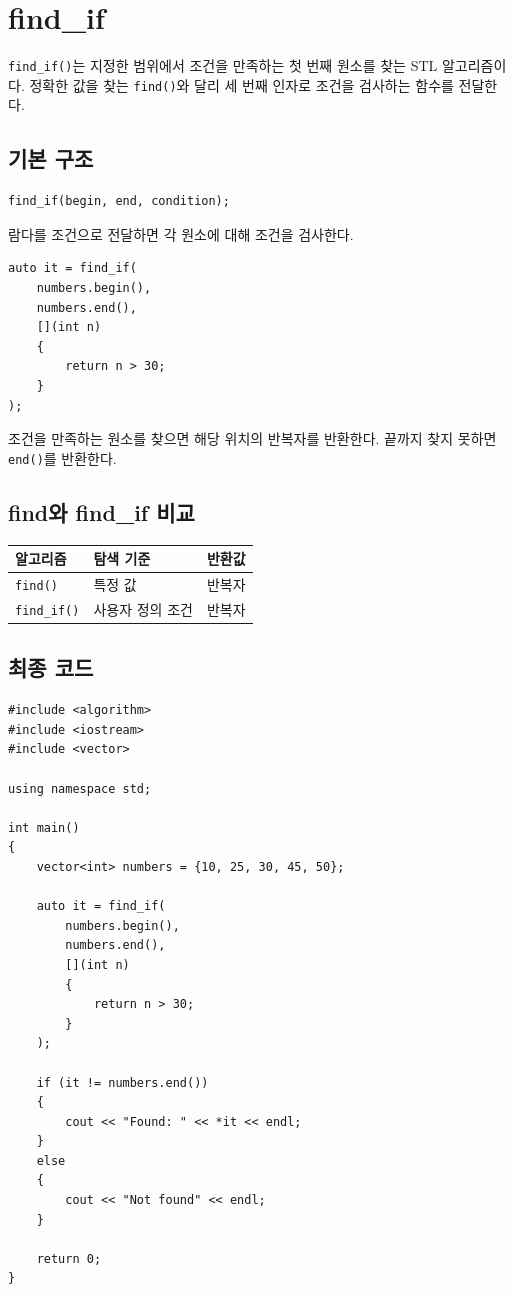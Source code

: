 \documentclass[11pt,a4paper]{article}
\begin{document}
\section{find\_if}
\texttt{find\_if()}는 지정한 범위에서 조건을 만족하는 첫 번째 원소를 찾는 STL 알고리즘이다.
정확한 값을 찾는 \texttt{find()}와 달리 세 번째 인자로 조건을 검사하는 함수를 전달한다.

\subsection{기본 구조}
\begin{lstlisting}
find_if(begin, end, condition);
\end{lstlisting}

람다를 조건으로 전달하면 각 원소에 대해 조건을 검사한다.

\begin{lstlisting}
auto it = find_if(
    numbers.begin(),
    numbers.end(),
    [](int n)
    {
        return n > 30;
    }
);
\end{lstlisting}

조건을 만족하는 원소를 찾으면 해당 위치의 반복자를 반환한다.
끝까지 찾지 못하면 \texttt{end()}를 반환한다.

\subsection{find와 find\_if 비교}
\begin{center}
\begin{tabular}{lll}
\toprule
알고리즘 & 탐색 기준 & 반환값 \\
\midrule
\texttt{find()} & 특정 값 & 반복자 \\
\texttt{find\_if()} & 사용자 정의 조건 & 반복자 \\
\bottomrule
\end{tabular}
\end{center}

\subsection{최종 코드}
\begin{lstlisting}
#include <algorithm>
#include <iostream>
#include <vector>

using namespace std;

int main()
{
    vector<int> numbers = {10, 25, 30, 45, 50};

    auto it = find_if(
        numbers.begin(),
        numbers.end(),
        [](int n)
        {
            return n > 30;
        }
    );

    if (it != numbers.end())
    {
        cout << "Found: " << *it << endl;
    }
    else
    {
        cout << "Not found" << endl;
    }

    return 0;
}
\end{lstlisting}
\end{document}
